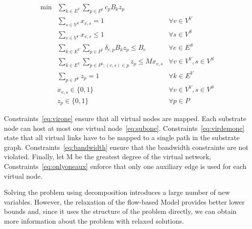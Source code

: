 \begin{align}
  \min  & \sum\limits_{k \in E^{V}}\sum\limits_{p \in P^k}  c_{p} B_k z_{p} \label{eq:obj} \\
        & \sum\limits_{s \in V^{S}} x_{v,s} = 1                                  & \forall v \in V^{V} \label{eq:virone} \\
        & \sum\limits_{v \in V^{V}} x_{v,s} \leq 1                               & \forall s \in V^{S} \label{eq:subone} \\
        & \sum\limits_{k \in E^{V}}\sum\limits_{p \in P^{k}} \delta_{e,p} B_{k} z_{p} \leq B_{e} & \forall e \in E^{S} \label{eq:bandwidth} \\
        & \sum\limits_{k \in E^{V}}\sum\limits_{p \in P^k : (v,s) \in p} z_{p} \leq M x_{v,s} & \forall v \in V^{V}, s \in V^{S} \label{eq:onlyoneaux}\\
        & \sum\limits_{p \in P^{k}} z_{p} = 1                                    & \forall k \in E^{V} \label{eq:virdemone} \\
        &  x_{v,s} \in \{0,1\}  & \forall v \in V^{V}, s \in V^{S} \nonumber \\
        & z_{p} \in \{0,1\}    & \forall p \in {P} \nonumber
\end{align}

Constraints~\eqref{eq:virone} ensure that all virtual nodes are mapped. Each substrate node can host at most one virtual node~\eqref{eq:subone}.
Constraints~\eqref{eq:virdemone} state that all virtual links have to be mapped to a single path in the substrate graph.
Constraints~\eqref{eq:bandwidth} ensure that the bandwidth constraints are not violated.
Finally, let M be the greatest degree of the virtual network, Constraints~\eqref{eq:onlyoneaux} enforce that only one auxiliary edge is used for each virtual node.

Solving the problem using decomposition introduces a large number of new variables. However, the relaxation of the flow-based Model provides better lower bounds and, since it uses the structure of the problem directly, we can obtain more information about the problem with relaxed solutions.

